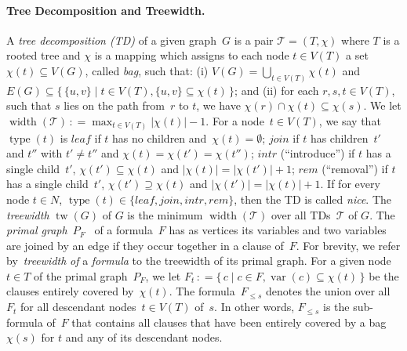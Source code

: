 \documentclass{llncs}
\newcommand{\SB}{\{\,}%
\newcommand{\SM}{\;{|}\;}%
\newcommand{\SE}{\,\}}%
\newcommand{\eqdef}{\ensuremath{\,\mathrel{\mathop:}=}}
\newcommand{\TTT}{\mathcal{T}}
\newcommand{\Card}[1]{|#1|}
\DeclareMathOperator{\tw}{tw}
\DeclareMathOperator{\width}{width}
\DeclareMathOperator{\var}{var}
\DeclareMathOperator{\type}{type}
\newcommand{\intr}{\textit{intr}}
\newcommand{\leaf}{\textit{leaf}}
\newcommand{\rem}{\textit{rem}}
\newcommand{\join}{\textit{join}}
\begin{document}
\paragraph*{Tree Decomposition and Treewidth.} %
%
A \emph{tree decomposition (TD)} of a given graph~$G$ is a pair
$\TTT=(T,\chi)$ where $T$ is a rooted tree and $\chi$ is a mapping
which assigns to each node $t\in V(T)$ a set~$\chi(t)\subseteq V(G)$,
called \emph{bag}, such that: (i) $V(G)=\bigcup_{t\in V(T)}\chi(t)$
and
$E(G)\subseteq\SB \{u,v\} \SM t\in V(T), \{u,v\}\subseteq \chi(t)\SE$;
and (ii) for each $r, s, t\in V(T)$, such that $s$ lies on the path
from~$r$ to $t$, we have $\chi(r) \cap \chi(t) \subseteq \chi(s)$. We
let $\width(\TTT) \eqdef \max_{t\in V(T)}\Card{\chi(t)}-1$.
%
For a node~$t \in V(T)$, we say that $\type(t)$ is $\leaf$ if $t$ has
no children and~$\chi(t)=\emptyset$; $\join$ if $t$ has children~$t'$ and $t''$ with
$t'\neq t''$ and $\chi(t) = \chi(t') = \chi(t'')$; $\intr$
(``introduce'') if $t$ has a single child~$t'$,
$\chi(t') \subseteq \chi(t)$ and $|\chi(t)| = |\chi(t')| + 1$; $\rem$
(``removal'') if $t$ has a single child~$t'$,
$\chi(t') \supseteq \chi(t)$ and $|\chi(t')| = |\chi(t)| + 1$. If for
every node $t\in N$, %
$\type(t) \in \{ \leaf, \join, \intr, \rem\}$, then the TD is called \emph{nice}.
%
The
\emph{treewidth} $\tw(G)$ of $G$ is the minimum $\width({\TTT})$ over
all TDs~$\TTT$ of $G$.
%
%
The \emph{primal graph}~$P_F$~\cite{SamerSzeider10b} of a formula~$F$
has as vertices its variables and two variables are joined by an edge
if they occur together in a clause of~$F$.  For brevity, we refer
by~\emph{treewidth} \emph{of} a \emph{formula} to the treewidth of its
primal graph. For a given node~$t \in T$ of the primal graph~$P_F$, we
let $F_t \eqdef \SB c \SM c \in F, \var(c) \subseteq \chi(t)\SE$ be
the clauses entirely covered by~$\chi(t)$.
%
The formula~$F_{\leq s}$ denotes the union over all~$F_t$ for all
descendant nodes~$t\in V(T)$ of~$s$. In other words, $F_{\leq s}$ is
the sub-formula of~$F$ that contains all clauses that have been
entirely covered by a bag~$\chi(s)$ for $t$ and any of its descendant
nodes.
%
%
\end{document}
